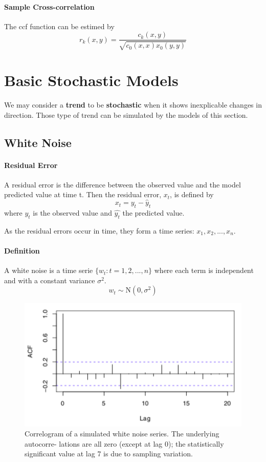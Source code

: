 \paragraph{Sample Cross-correlation}
The ccf function can be estimed by
\[ r_k(x, y) = \frac{c_k(x, y)}{\sqrt{c_0(x, x) x_0(y, y)}} \]

\section{Basic Stochastic Models}

We may consider a \textbf{trend} to be \textbf{stochastic} when it shows inexplicable changes in direction. Those type of trend can be simulated by the models of this section.

\subsection{White Noise}

\paragraph{Residual Error}
A residual error is the difference between the observed value and the model predicted value at time t. Then the residual error, $x_t$, is defined by
\[ x_t = y_t - \hat{y}_t \]
where $y_t$ is the observed value and $\hat{y_t}$ the predicted value.

As the residual errors occur in time, they form a time series: $x_1, x_2,..., x_n$.

\paragraph{Definition} 
A white noise is a time serie $\{w_t : t = 1,2,...,n\}$ where each term is independent and with a constant variance $\sigma^2$.
\[ w_t \sim \mathrm{N}(0, \sigma^2) \]

\begin{figure}[!ht]
    \centering
    \includegraphics[scale=0.7]{src/SerieChronologique/WhiteNoise-Correlogram.png}
    \caption{Correlogram of a simulated white noise series. The underlying autocorre- lations are all zero (except at lag 0); the statistically significant value at lag 7 is due to sampling variation.}
\end{figure}

